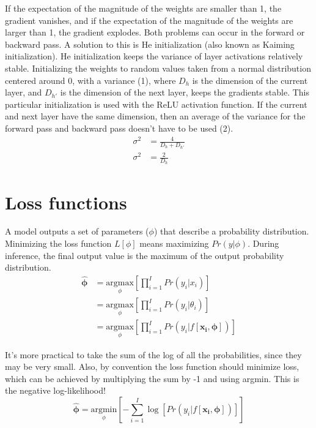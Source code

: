 \documentclass{article}
\begin{document}
If the expectation of the magnitude of the weights are smaller than 1, the gradient vanishes, and if the expectation of the magnitude of the weights are larger than 1, the gradient explodes. Both problems can occur in the forward or backward pass. A solution to this is He initialization (also known as Kaiming initialization). He initialization keeps the variance of layer activations relatively stable. Initializing the weights to random values taken from a normal distribution centered around 0, with a variance (1), where $D_h$ is the dimension of the current layer, and $D_{h'}$ is the dimension of the next layer, keeps the gradients stable. This particular initialization is used with the ReLU activation function. If the current and next layer have the same dimension, then an average of the variance for the forward pass and backward pass doesn't have to be used (2).
\begin{align*}
\sigma^2 &= \frac{4}{D_h + D_{h'}}\tag{1}\\
\sigma^2 &= \frac{2}{D_h}\tag{2}
\end{align*}

\section{Loss functions}
A model outputs a set of parameters ($\phi$) that describe a probability distribution. Minimizing the loss function $L[\phi]$ means maximizing $Pr(y|\phi)$. During inference, the final output value is the maximum of the output probability distribution.
\begin{align*}
\boldsymbol{\hat{\phi}} &= \underset{\phi}{\text{argmax}}\left[\prod_{i = 1}^{I} Pr(y_i|x_i)\right]\\
                        &= \underset{\phi}{\text{argmax}}\left[\prod_{i = 1}^{I} Pr(y_i|\theta_i)\right]\\
                        &= \underset{\phi}{\text{argmax}}\left[\prod_{i = 1}^{I} Pr(y_i|f[\mathbf{x_i}, \boldsymbol{\phi}])\right]
\end{align*}

It's more practical to take the sum of the log of all the probabilities, since they may be very small. Also, by convention the loss function should minimize loss, which can be achieved by multiplying the sum by -1 and using argmin. This is the negative log-likelihood!
\[ \boldsymbol{\hat{\phi}} = \underset{\phi}{\text{argmin}}\left[-\sum_{i = 1}^{I} \log[Pr(y_i|f[\mathbf{x_i}, \boldsymbol{\phi}])]\right] \]
\end{document}
